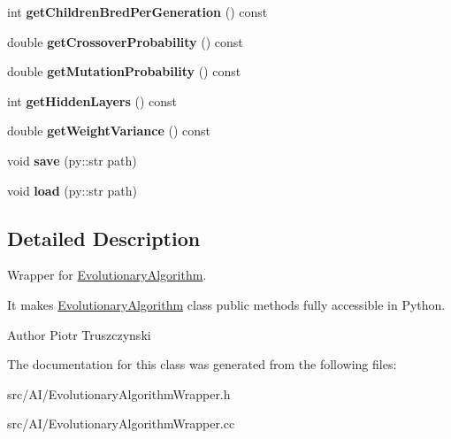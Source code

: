 \begin{DoxyCompactItemize}
\item 
int {\bfseries get\+Children\+Bred\+Per\+Generation} () const \hypertarget{classEvolutionaryAlgorithmWrapper_a57c4695118cd26f631249475909536d1}{}\label{classEvolutionaryAlgorithmWrapper_a57c4695118cd26f631249475909536d1}

\item 
double {\bfseries get\+Crossover\+Probability} () const \hypertarget{classEvolutionaryAlgorithmWrapper_aaae34ae1a86c2657f6c6e7df9a11abd4}{}\label{classEvolutionaryAlgorithmWrapper_aaae34ae1a86c2657f6c6e7df9a11abd4}

\item 
double {\bfseries get\+Mutation\+Probability} () const \hypertarget{classEvolutionaryAlgorithmWrapper_a16919549583ded08cc68d4c347139f3a}{}\label{classEvolutionaryAlgorithmWrapper_a16919549583ded08cc68d4c347139f3a}

\item 
int {\bfseries get\+Hidden\+Layers} () const \hypertarget{classEvolutionaryAlgorithmWrapper_a2068aa92fabea0cd01eb947ed7c1878f}{}\label{classEvolutionaryAlgorithmWrapper_a2068aa92fabea0cd01eb947ed7c1878f}

\item 
double {\bfseries get\+Weight\+Variance} () const \hypertarget{classEvolutionaryAlgorithmWrapper_a1c41322041be3dd2fcf83e811a14ad98}{}\label{classEvolutionaryAlgorithmWrapper_a1c41322041be3dd2fcf83e811a14ad98}

\item 
void {\bfseries save} (py\+::str path)\hypertarget{classEvolutionaryAlgorithmWrapper_ad6a1427c9713d12e3c67c63e148b77ec}{}\label{classEvolutionaryAlgorithmWrapper_ad6a1427c9713d12e3c67c63e148b77ec}

\item 
void {\bfseries load} (py\+::str path)\hypertarget{classEvolutionaryAlgorithmWrapper_af984c09607567a57e3afec9188fae046}{}\label{classEvolutionaryAlgorithmWrapper_af984c09607567a57e3afec9188fae046}

\end{DoxyCompactItemize}


\subsection{Detailed Description}
Wrapper for \hyperlink{classEvolutionaryAlgorithm}{Evolutionary\+Algorithm}. 

It makes \hyperlink{classEvolutionaryAlgorithm}{Evolutionary\+Algorithm} class public methods fully accessible in Python. \begin{DoxyAuthor}{Author}
Piotr Truszczynski 
\end{DoxyAuthor}


The documentation for this class was generated from the following files\+:\begin{DoxyCompactItemize}
\item 
src/\+A\+I/Evolutionary\+Algorithm\+Wrapper.\+h\item 
src/\+A\+I/Evolutionary\+Algorithm\+Wrapper.\+cc\end{DoxyCompactItemize}
